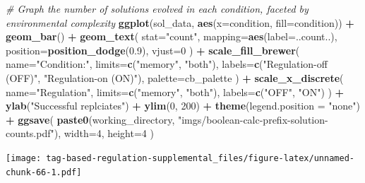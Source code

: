 \documentclass[]{book}
\newenvironment{Shaded}{\begin{snugshade}}{\end{snugshade}}
\newcommand{\CommentTok}[1]{\textcolor[rgb]{0.56,0.35,0.01}{\textit{#1}}}
\newcommand{\DataTypeTok}[1]{\textcolor[rgb]{0.13,0.29,0.53}{#1}}
\newcommand{\DecValTok}[1]{\textcolor[rgb]{0.00,0.00,0.81}{#1}}
\newcommand{\FloatTok}[1]{\textcolor[rgb]{0.00,0.00,0.81}{#1}}
\newcommand{\KeywordTok}[1]{\textcolor[rgb]{0.13,0.29,0.53}{\textbf{#1}}}
\newcommand{\NormalTok}[1]{#1}
\newcommand{\OperatorTok}[1]{\textcolor[rgb]{0.81,0.36,0.00}{\textbf{#1}}}
\newcommand{\StringTok}[1]{\textcolor[rgb]{0.31,0.60,0.02}{#1}}
\begin{document}
\begin{Shaded}
\begin{Highlighting}[]
\CommentTok{# Graph the number of solutions evolved in each condition, faceted by environmental complexity}
\KeywordTok{ggplot}\NormalTok{(sol_data, }\KeywordTok{aes}\NormalTok{(}\DataTypeTok{x=}\NormalTok{condition, }\DataTypeTok{fill=}\NormalTok{condition)) }\OperatorTok{+}
\StringTok{  }\KeywordTok{geom_bar}\NormalTok{() }\OperatorTok{+}
\StringTok{  }\KeywordTok{geom_text}\NormalTok{(}
    \DataTypeTok{stat=}\StringTok{"count"}\NormalTok{,}
    \DataTypeTok{mapping=}\KeywordTok{aes}\NormalTok{(}\DataTypeTok{label=}\NormalTok{..count..),}
    \DataTypeTok{position=}\KeywordTok{position_dodge}\NormalTok{(}\FloatTok{0.9}\NormalTok{),}
    \DataTypeTok{vjust=}\DecValTok{0}
\NormalTok{  ) }\OperatorTok{+}
\StringTok{  }\KeywordTok{scale_fill_brewer}\NormalTok{(}
    \DataTypeTok{name=}\StringTok{"Condition:"}\NormalTok{,}
    \DataTypeTok{limits=}\KeywordTok{c}\NormalTok{(}\StringTok{"memory"}\NormalTok{, }\StringTok{"both"}\NormalTok{),}
    \DataTypeTok{labels=}\KeywordTok{c}\NormalTok{(}\StringTok{"Regulation-off (OFF)"}\NormalTok{, }\StringTok{"Regulation-on (ON)"}\NormalTok{),}
    \DataTypeTok{palette=}\NormalTok{cb_palette}
\NormalTok{  ) }\OperatorTok{+}
\StringTok{  }\KeywordTok{scale_x_discrete}\NormalTok{(}
    \DataTypeTok{name=}\StringTok{"Regulation"}\NormalTok{,}
    \DataTypeTok{limits=}\KeywordTok{c}\NormalTok{(}\StringTok{"memory"}\NormalTok{, }\StringTok{"both"}\NormalTok{),}
    \DataTypeTok{labels=}\KeywordTok{c}\NormalTok{(}\StringTok{"OFF"}\NormalTok{, }\StringTok{"ON"}\NormalTok{)}
\NormalTok{  ) }\OperatorTok{+}
\StringTok{  }\KeywordTok{ylab}\NormalTok{(}\StringTok{"Successful replciates"}\NormalTok{) }\OperatorTok{+}
\StringTok{  }\KeywordTok{ylim}\NormalTok{(}\DecValTok{0}\NormalTok{, }\DecValTok{200}\NormalTok{) }\OperatorTok{+}
\StringTok{  }\KeywordTok{theme}\NormalTok{(}\DataTypeTok{legend.position =} \StringTok{"none"}\NormalTok{) }\OperatorTok{+}
\StringTok{  }\KeywordTok{ggsave}\NormalTok{(}
    \KeywordTok{paste0}\NormalTok{(working_directory, }\StringTok{"imgs/boolean-calc-prefix-solution-counts.pdf"}\NormalTok{),}
    \DataTypeTok{width=}\DecValTok{4}\NormalTok{,}
    \DataTypeTok{height=}\DecValTok{4}
\NormalTok{  )}
\end{Highlighting}
\end{Shaded}

\texttt{[image: tag-based-regulation-supplemental\_files/figure-latex/unnamed-chunk-66-1.pdf]}
\end{document}
